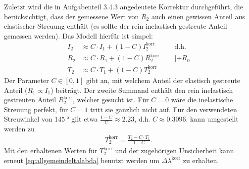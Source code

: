 \documentclass[ngerman,a4paper,twocolumn,twoside]{scrartcl}
\begin{document}
\par
Zuletzt wird die in Aufgabenteil 3.4.3 angedeutete Korrektur durchgeführt, die berücksichtigt, dass der gemessene Wert von $R_2$ auch einen gewissen Anteil aus elastischer Streuung enthält (es sollte der rein inelastisch gestreute Anteil gemessen werden). Das Modell hierfür ist simpel:
\begin{align}
I_2 &\approx C \cdot I_1 + (1-C) I_2^\text{korr} \qquad &\text{d.h.}\\
R_2 &\approx C \cdot R_1 + (1-C) R_2^\text{korr} &| \div R_0 \\
T_2 &\approx C \cdot T_1 + (1-C) T_2^\text{korr} \label{eq:korrekturzwischenschritt}
\end{align}
Der Parameter $C\in [0,1]$ gibt an, mit welchem Anteil der elastisch gestreute Anteil ($R_1\propto I_1$) beiträgt. Der zweite Summand enthält den rein inelastisch gestreuten Anteil $R_2^\text{korr}$, welcher gesucht ist. Für $C=0$ wäre die inelastische Streuung perfekt, für $C=1$ tritt sie gänzlich nicht auf. Für den verwendeten Streuwinkel von $\SI{145}{\degree}$ gilt etwa $\frac{1-C}{C}\approx\num{2.23}$, d.h. $C\approx\num{0.3096}$.  kann umgestellt werden zu
\begin{align}
T_2^\text{korr} = \frac{T_2-C\cdot T_1}{1-C}. \label{eq:korrektur}
\end{align}
Mit den erhaltenen Werten für $T_2^\text{korr}$ und der zugehörigen Unsicherheit kann erneut \cref{eq:allgemeindeltalabda} benutzt werden um $\Delta \lambda^\text{korr}$ zu erhalten.
\end{document}
